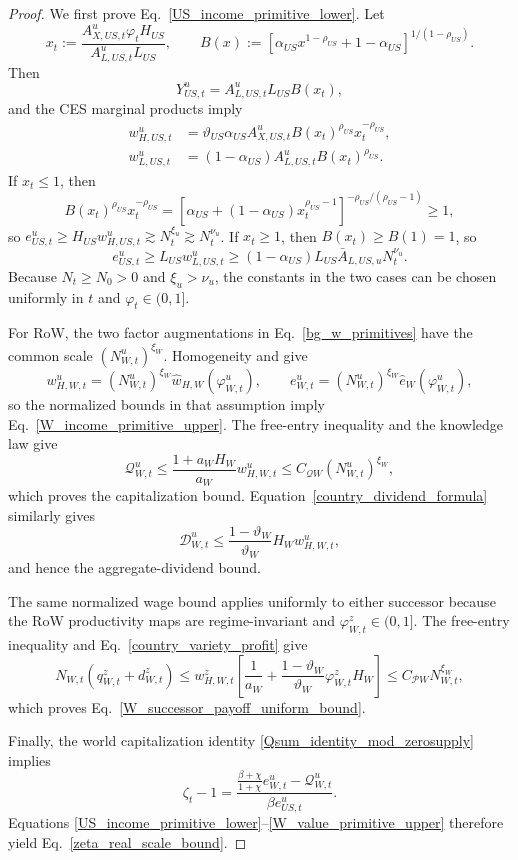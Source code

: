 \documentclass{article}
\def\green#1{#1}%
\begin{document}
\begin{proof}
We first prove Eq.~\eqref{US_income_primitive_lower}.  Let
\[
x_t
:=
\frac{A_{X,US,t}^u\varphi_tH_{US}}
     {A_{L,US,t}^uL_{US}},
\qquad
B(x)
:=
\left[\alpha_{US}x^{1-\rho_{US}}+1-\alpha_{US}\right]^{1/(1-\rho_{US})}.
\]
Then
\[
Y_{US,t}^u=A_{L,US,t}^uL_{US}B(x_t),
\]
and the CES marginal products imply
\begin{align*}
w_{H,US,t}^u
&=
\vartheta_{US}\alpha_{US}A_{X,US,t}^uB(x_t)^{\rho_{US}}x_t^{-\rho_{US}},\\
w_{L,US,t}^u
&=
(1-\alpha_{US})A_{L,US,t}^uB(x_t)^{\rho_{US}}.
\end{align*}
If $x_t\le1$, then
\[
B(x_t)^{\rho_{US}}x_t^{-\rho_{US}}
=
\left[\alpha_{US}+(1-\alpha_{US})x_t^{\rho_{US}-1}\right]^{-\rho_{US}/(\rho_{US}-1)}
\ge1,
\]
so $e_{US,t}^u\ge H_{US}w_{H,US,t}^u\gtrsim N_t^{\xi_u}\gtrsim N_t^{\nu_u}$.  If $x_t\ge1$, then $B(x_t)\ge B(1)=1$, so
\[
e_{US,t}^u
\ge L_{US}w_{L,US,t}^u
\ge
(1-\alpha_{US})L_{US}\bar A_{L,US,u}N_t^{\nu_u}.
\]
Because $N_t\ge N_0>0$ and $\xi_u>\nu_u$, the constants in the two cases can be chosen uniformly in $t$ and $\varphi_t\in(0,1]$.

For RoW, the two factor augmentations in Eq.~\eqref{bg_w_primitives} have the common scale $(N_{W,t}^u)^{\xi_W}$.  \green{Homogeneity and  give}
\[
\green{w}_{\green{H},\green{W},\green{t}}^\green{u}
\green{=}(\green{N}_{W,t}^\green{u})^{\green{\xi}_\green{W}}\green{\widehat w}_{\green{H},W}(\varphi_{W,t}^\green{u}),
\qquad
\green{e}_{\green{W},\green{t}}^\green{u}
\green{=}(\green{N}_{\green{W},\green{t}}^\green{u})^{\green{\xi}_W}\green{\widehat e}_\green{W}(\green{\varphi}_{\green{W},\green{t}}^\green{u}),
\]
\green{so} the \green{normalized bounds in that assumption imply Eq}.~\green{\eqref{W_income_primitive_upper}}.  \green{The free-entry inequality} and the knowledge law give
\[
\mathcal Q_{W,t}^u
\le
\frac{1+a_WH_W}{a_W}\green{w}_{\green{H},\green{W},\green{t}}^\green{u}
\green{\le C}_{\green{\mathcal QW}}(\green{N}_{W,t}^u)^{\green{\xi}_\green{W}},
\]
which proves the capitalization bound.  Equation~\eqref{country_dividend_formula} similarly gives
\[
\mathcal D_{W,t}^u
\le
\frac{1-\vartheta_W}{\vartheta_W}
\green{H}_\green{Ww}_{\green{H},W,t}^u,
\]
and hence the aggregate-dividend bound.

The same normalized wage bound applies uniformly to either successor because the RoW productivity maps are regime-invariant and $\varphi_{W,t}^z\in(0,1]$.  \green{The free-entry inequality} and Eq.~\eqref{country_variety_profit} give
\[
N_{W,t}(q_{W,t}^z+d_{W,t}^z)
\green{\le}
w_{H,W,t}^z
\left[
\frac{1}{a_W}
+
\frac{1-\vartheta_W}{\vartheta_W}\varphi_{W,t}^zH_W
\right]
\le
C_{\mathcal PW}N_{W,t}^{\xi_W},
\]
which proves Eq.~\eqref{W_successor_payoff_uniform_bound}.

Finally, the world capitalization identity \eqref{Qsum_identity_mod_zerosupply} implies
\[
\zeta_t-1
=
\frac{
\frac{\beta+\chi}{1+\chi}e_{W,t}^u-\mathcal Q_{W,t}^u
}{\beta e_{US,t}^u}.
\]
Equations \eqref{US_income_primitive_lower}--\eqref{W_value_primitive_upper} therefore yield Eq.~\eqref{zeta_real_scale_bound}.
\end{proof}
\end{document}
